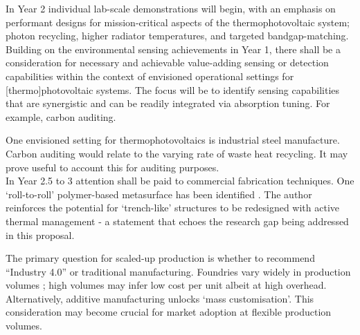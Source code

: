 In Year 2 individual lab-scale demonstrations will begin, with an emphasis on performant designs for mission-critical aspects of the thermophotovoltaic system; photon recycling, higher radiator temperatures, and targeted bandgap-matching.
Building on the environmental sensing achievements in Year 1, there shall be a consideration for necessary and achievable value-adding sensing or detection capabilities within the context of envisioned operational settings for [thermo]photovoltaic systems. The focus will be to identify sensing capabilities that are synergistic and can be readily integrated via absorption tuning. For example, carbon auditing.

One envisioned setting for thermophotovoltaics is industrial steel manufacture. Carbon auditing would relate to the varying rate of waste heat recycling. It may prove useful to account this for auditing purposes.
\\
In Year 2.5 to 3 attention shall be paid to commercial fabrication techniques. One ‘roll-to-roll’ polymer-based metasurface has been identified \cite{Ma2023}. The author reinforces the potential for ‘trench-like’ structures to be redesigned with active thermal management - a statement that echoes the research gap being addressed in this proposal.

        The primary question for scaled-up production is whether to recommend “Industry 4.0” or traditional manufacturing. Foundries vary widely in production volumes \cite{wiki:memsfoundries}; high volumes may infer low cost per unit albeit at high overhead. Alternatively, additive manufacturing unlocks ‘mass customisation’. This consideration may become crucial for market adoption at flexible production volumes.


